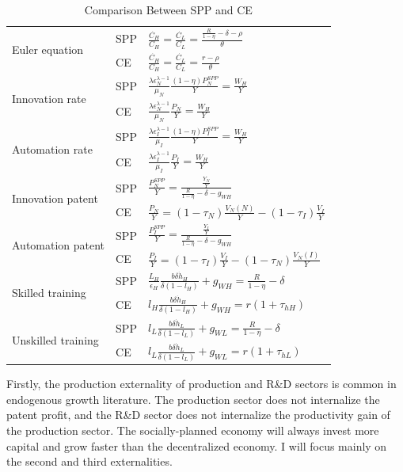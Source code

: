 \documentclass[12pt]{article}
\begin{document}
\begin{table}[h!]
\center
\caption{Comparison Between SPP and CE}
\label{SPP_CE}
\renewcommand{\arraystretch}{2}
\begin{tabular}{l|ll}
\hline \hline
\multirow{2}{*}{Euler equation} & SPP  &  
$\frac{\dot{C_H}}{C_H} = \frac{\dot{C_L}}{C_L} = \frac{\frac{R}{1-\eta}-\delta-\rho}{\theta}$ \\
& CE &$\frac{\dot{C_H}}{C_H} = \frac{\dot{C_L}}{C_L} = \frac{r-\rho}{\theta}$ \\\hline
\multirow{2}{*}{Innovation rate} & SPP  &  
$\frac{\lambda\epsilon_N^{\lambda-1}}{\mu_N}\frac{(1-\eta)P_N^{SPP}}{Y} = \frac{W_H}{Y} $  \\ 
& CE &$\frac{\lambda\epsilon_N^{\lambda-1}}{\mu_N}\frac{P_N}{Y}  = \frac{W_H}{Y}$ \\\hline
\multirow{2}{*}{Automation rate}  & SPP  &  
$ \frac{\lambda\epsilon_I^{\lambda-1}}{\mu_I}\frac{(1-\eta)P_I^{SPP}}{Y}  = \frac{W_H}{Y}$  \\
& CE &$ \frac{\lambda\epsilon_I^{\lambda-1}}{\mu_I}\frac{P_I}{Y}  = \frac{W_H}{Y}$ \\\hline
\multirow{2}{*}{Innovation patent} & SPP  &  
$\frac{P_N^{SPP}}{Y} = \frac{\frac{Y_N}{Y}}{\frac{R}{1-\eta}-\delta-g_{WH}}$  \\
& CE &$\frac{P_N}{Y} =(1-\tau_N)\frac{V_N(N)}{Y}-(1-\tau_I)\frac{V_I}{Y}$ \\\hline
\multirow{2}{*}{Automation patent} & SPP  &  
$\frac{P_I^{SPP}}{Y}= \frac{\frac{Y_I}{Y}}{\frac{R}{1-\eta}-\delta-g_{WH}}$  \\
& CE &$\frac{P_I}{Y}  =  (1-\tau_I)\frac{V_I}{Y}-(1-\tau_N)\frac{V_N(I)}{Y}$ \\\hline
\multirow{2}{*}{Skilled training} & SPP  &  
$\frac{L_H}{\epsilon_H}\frac{b\delta \dot{h}_H}{\delta(1-l_H)}+g_{WH} = \frac{R}{1-\eta}-\delta$  \\ 
& CE &$l_H\frac{b\delta \dot{h}_H}{\delta(1-l_H)}+g_{WH} =  r(1+\tau_{hH})$ \\\hline
\multirow{2}{*}{Unskilled training} & SPP  &  
$l_L\frac{b\delta \dot{h}_L}{\delta(1-l_L)}+g_{WL}= \frac{R}{1-\eta}-\delta$  \\ 
& CE &$l_L\frac{b\delta \dot{h}_L}{\delta(1-l_L)}+g_{WL}=  r(1+\tau_{hL})$ \\\hline
\end{tabular}
\renewcommand{\arraystretch}{1}
\end{table}

Firstly, the production externality of production and R\&D sectors is common in endogenous growth literature. The production sector does not internalize the
patent profit, and the R\&D sector does not internalize the productivity gain of the production sector. The socially-planned economy will always invest more capital and grow faster than the decentralized economy. I will focus mainly on the second and third externalities.
\end{document}
